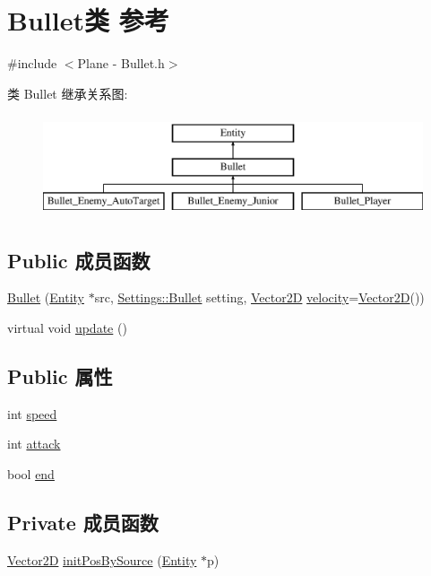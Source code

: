 \hypertarget{class_bullet}{}\section{Bullet类 参考}
\label{class_bullet}


{\ttfamily \#include $<$Plane -\/ Bullet.\+h$>$}

类 Bullet 继承关系图\+:\begin{figure}[H]
\begin{center}
\leavevmode
\includegraphics[height=3.000000cm]{class_bullet}
\end{center}
\end{figure}
\subsection*{Public 成员函数}
\begin{DoxyCompactItemize}
\item 
\hyperlink{class_bullet_ae9b56731be2ca3ff77f3a3ee4eb0bd25}{Bullet} (\hyperlink{class_entity}{Entity} $\ast$src, \hyperlink{struct_settings_1_1_bullet}{Settings\+::\+Bullet} setting, \hyperlink{_vector2_d_8hpp_aa1f1145650f1dd9bddf7335ec6434d7c}{Vector2D} \hyperlink{class_entity_a386d25b56772b8913eb3e5adc636f6e0}{velocity}=\hyperlink{_vector2_d_8hpp_aa1f1145650f1dd9bddf7335ec6434d7c}{Vector2D}())
\item 
virtual void \hyperlink{class_bullet_a32f4a0611fe2dd245fee955d14ca1f68}{update} ()
\end{DoxyCompactItemize}
\subsection*{Public 属性}
\begin{DoxyCompactItemize}
\item 
int \hyperlink{class_bullet_a110bd4348fc7547125b4ec4bbf94d5f5}{speed}
\item 
int \hyperlink{class_bullet_ab9e1e40341cddf25f8acc4e378b26f4a}{attack}
\item 
bool \hyperlink{class_bullet_aff37198e603e1a2b8ff28e0df6e156a4}{end}
\end{DoxyCompactItemize}
\subsection*{Private 成员函数}
\begin{DoxyCompactItemize}
\item 
\hyperlink{_vector2_d_8hpp_aa1f1145650f1dd9bddf7335ec6434d7c}{Vector2D} \hyperlink{class_bullet_ac8350c88346ae354e7144fa20b6cb2a2}{init\+Pos\+By\+Source} (\hyperlink{class_entity}{Entity} $\ast$p)
\end{DoxyCompactItemize}
